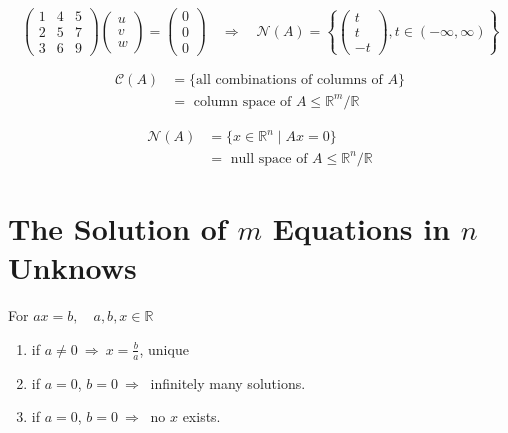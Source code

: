\begin{eg}
\[
\begin{pmatrix}
    1 & 4 & 5 \\
    2 & 5 & 7 \\
    3 & 6 & 9
\end{pmatrix} \begin{pmatrix}
    u \\ v \\ w
\end{pmatrix} = \begin{pmatrix}
    0 \\ 0 \\ 0
\end{pmatrix} \quad \Longrightarrow \quad \mathcal{N}(A) = \left\{ \begin{pmatrix}
    t\\ t\\ -t
\end{pmatrix}, t \in (-\infty, \infty) \right\}
\]
\end{eg}

\begin{align*}
    \mathcal{C}(A) &= \{ \text{all combinations of columns of } A \} \\
    &= \text{ column space of }A \leq \mathbb{R}^m / \mathbb{R}
\end{align*}

\begin{align*}
    \mathcal{N}(A) &= \{ x \in \mathbb{R}^n \;|\; Ax=0 \} \\
    &= \text{ null space of }A \leq \mathbb{R}^n / \mathbb{R}
\end{align*}

\section{The Solution of $m$ Equations in $n$ Unknows}

For $ax = b, \quad a,b,x \in \mathbb{R}$

\begin{enumerate}[label=(\roman*)]
    \item if $\displaystyle a\neq 0 \ \Rightarrow \ x = \frac{b}{a}$, unique
    \item if $a = 0$, $b = 0 \ \Rightarrow \ $ infinitely many solutions.
    \item if $a = 0$, $b = 0 \ \Rightarrow \ $ no $x$ exists.
\end{enumerate}

\noindent\hrulefill

